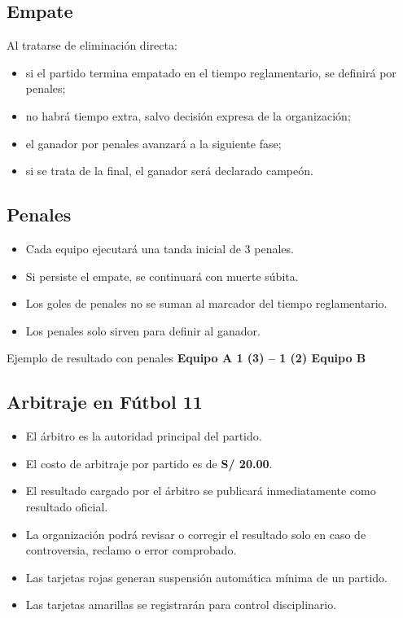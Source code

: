 \documentclass[12pt,a4paper]{article}
\begin{document}
	\subsection{Empate}
	
	Al tratarse de eliminación directa:
	
	\begin{itemize}
		\item si el partido termina empatado en el tiempo reglamentario, se definirá por penales;
		\item no habrá tiempo extra, salvo decisión expresa de la organización;
		\item el ganador por penales avanzará a la siguiente fase;
		\item si se trata de la final, el ganador será declarado campeón.
	\end{itemize}
	
	\subsection{Penales}
	
	\begin{itemize}
		\item Cada equipo ejecutará una tanda inicial de 3 penales.
		\item Si persiste el empate, se continuará con muerte súbita.
		\item Los goles de penales no se suman al marcador del tiempo reglamentario.
		\item Los penales solo sirven para definir al ganador.
	\end{itemize}
	
	\begin{cajaImportante}{Ejemplo de resultado con penales}
		\centering
		{\Large \textbf{Equipo A 1 (3) -- 1 (2) Equipo B}}
	\end{cajaImportante}
	
	\subsection{Arbitraje en Fútbol 11}
	
	\begin{itemize}
		\item El árbitro es la autoridad principal del partido.
		\item El costo de arbitraje por partido es de \textbf{S/ 20.00}.
		\item El resultado cargado por el árbitro se publicará inmediatamente como resultado oficial.
		\item La organización podrá revisar o corregir el resultado solo en caso de controversia, reclamo o error comprobado.
		\item Las tarjetas rojas generan suspensión automática mínima de un partido.
		\item Las tarjetas amarillas se registrarán para control disciplinario.
	\end{itemize}
	
\end{document}
